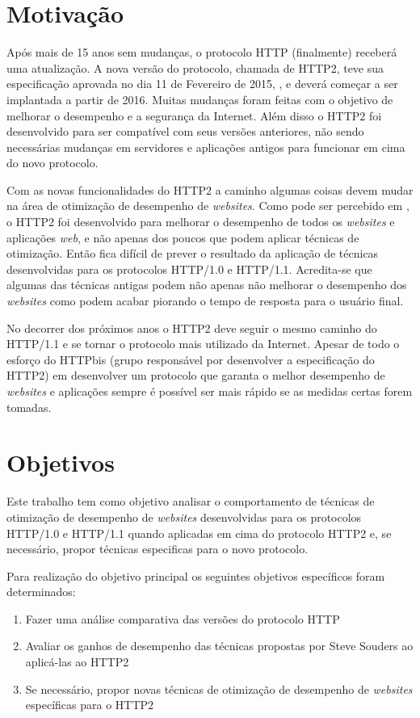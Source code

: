 \section{Motivação}
\label{sec:motivacao}

Após mais de 15 anos sem mudanças, o protocolo HTTP (finalmente) receberá uma atualização. A nova versão do protocolo, chamada de HTTP2, teve sua especificação aprovada no dia 11 de Fevereiro de 2015, \cite{HTTP2Spec}, e deverá começar a ser implantada a partir de 2016. Muitas mudanças foram feitas com o objetivo de melhorar o desempenho e a segurança da Internet. Além disso o HTTP2 foi desenvolvido para ser compatível com seus versões anteriores, não sendo necessárias mudanças em servidores e aplicações antigos para funcionar em cima do novo protocolo.

Com as novas funcionalidades do HTTP2 a caminho algumas coisas devem mudar na área de otimização de desempenho de \textit{websites}. Como pode ser percebido em \cite{HTTP2Explained}, o HTTP2 foi desenvolvido para melhorar o desempenho de todos os \textit{websites} e aplicações \textit{web}, e não apenas dos poucos que podem aplicar técnicas de otimização. Então fica difícil de prever o resultado da aplicação de técnicas desenvolvidas para os protocolos HTTP/1.0 e HTTP/1.1. Acredita-se que algumas das técnicas antigas podem não apenas não melhorar o desempenho dos \textit{websites} como podem acabar piorando o tempo de resposta para o usuário final.

No decorrer dos próximos anos o HTTP2 deve seguir o mesmo caminho do HTTP/1.1 e se tornar o protocolo mais utilizado da Internet. Apesar de todo o esforço do HTTPbis (grupo responsável por desenvolver a especificação do HTTP2) em desenvolver um protocolo que garanta o melhor desempenho de \textit{websites} e aplicações sempre é possível ser mais rápido se as medidas certas forem tomadas.

\section{Objetivos}
\label{sec:objetivos}

Este trabalho tem como objetivo analisar o comportamento de técnicas de otimização de desempenho de \textit{websites} desenvolvidas para os protocolos HTTP/1.0 e HTTP/1.1 quando aplicadas em cima do protocolo HTTP2 e, se necessário, propor técnicas especificas para o novo protocolo.

Para realização do objetivo principal os seguintes objetivos específicos foram determinados:

\begin{enumerate}
	\item Fazer uma análise comparativa das versões do protocolo HTTP
	\item Avaliar os ganhos de desempenho das técnicas propostas por Steve Souders ao aplicá-las ao HTTP2
	\item Se necessário, propor novas técnicas de otimização de desempenho de \textit{websites} específicas para o HTTP2
\end{enumerate}